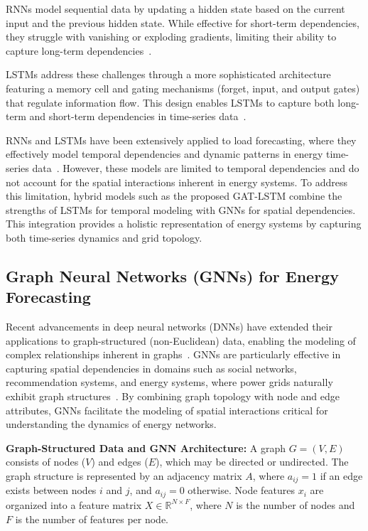 \documentclass[sigconf,nonacm]{acmart}
\begin{document}
RNNs model sequential data by updating a hidden state based on the current input and the previous hidden state. While effective for short-term dependencies, they struggle with vanishing or exploding gradients, limiting their ability to capture long-term dependencies~\cite{Colah2015,Kag2021,Mozer1991}. 

LSTMs address these challenges through a more sophisticated architecture featuring a memory cell and gating mechanisms (forget, input, and output gates) that regulate information flow. This design enables LSTMs to capture both long-term and short-term dependencies in time-series data~\cite{Gers2000, Hochreiter1997,  Gers2002}.

RNNs and LSTMs have been extensively applied to load forecasting, where they effectively model temporal dependencies and dynamic patterns in energy time-series data~\cite{Jin2022,Bianchi2017,Fang2023,PerezOrtiz2003}. However, these models are limited to temporal dependencies and do not account for the spatial interactions inherent in energy systems. To address this limitation, hybrid models such as the proposed GAT-LSTM combine the strengths of LSTMs for temporal modeling with GNNs for spatial dependencies. This integration provides a holistic representation of energy systems by capturing both time-series dynamics and grid topology.


\subsection{Graph Neural Networks (GNNs) for Energy Forecasting}

Recent advancements in deep neural networks (DNNs) have extended their applications to graph-structured (non-Euclidean) data, enabling the modeling of complex relationships inherent in graphs~\cite{Gori2005, Scarselli2008, Liao2021}. GNNs are particularly effective in capturing spatial dependencies in domains such as social networks, recommendation systems, and energy systems, where power grids naturally exhibit graph structures~\cite{Hu2024}. By combining graph topology with node and edge attributes, GNNs facilitate the modeling of spatial interactions critical for understanding the dynamics of energy networks.

\textbf{Graph-Structured Data and GNN Architecture:} A graph $G = (V, E)$ consists of nodes ($V$) and edges ($E$), which may be directed or undirected. The graph structure is represented by an adjacency matrix $A$, where $a_{ij} = 1$ if an edge exists between nodes $i$ and $j$, and $a_{ij} = 0$ otherwise. Node features $x_i$ are organized into a feature matrix $X \in \mathbb{R}^{N \times F}$, where $N$ is the number of nodes and $F$ is the number of features per node.
\end{document}
